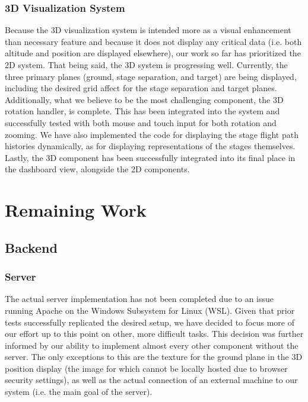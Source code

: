\documentclass[journal,10pt,onecolumn,compsoc]{IEEEtran}
\begin{document}
		\subsubsection{3D Visualization System}
			Because the 3D visualization system is intended more as a visual enhancement than necessary feature and because it does not display any critical data (i.e. both altitude and position are displayed elsewhere), our work so far has prioritized the 2D system.
			That being said, the 3D system is progressing well.
			Currently, the three primary planes (ground, stage separation, and target) are being displayed, including the desired grid affect for the stage separation and target planes.
			Additionally, what we believe to be the most challenging component, the 3D rotation handler, is complete.
			This has been integrated into the system and successfully tested with both mouse and touch input for both rotation and zooming.
			We have also implemented the code for displaying the stage flight path histories dynamically, as for displaying representations of the stages themselves.
			Lastly, the 3D component has been successfully integrated into its final place in the dashboard view, alongside the 2D components.	
\newpage


\section{Remaining Work}

	\subsection{Backend}
		
		\subsubsection{}
			
		\subsubsection{}
		
		\subsubsection{Server}
			The actual server implementation has not been completed due to an issue running Apache on the Windows Subsystem for Linux (WSL).
			Given that prior tests successfully replicated the desired setup, we have decided to focus more of our effort up to this point on other, more difficult tasks.
			This decision was further informed by our ability to implement almost every other component without the server.
			The only exceptions to this are the texture for the ground plane in the 3D position display (the image for which cannot be locally hosted due to browser security settings), as well as the actual connection of an external machine to our system (i.e. the main goal of the server).
	
\end{document}
